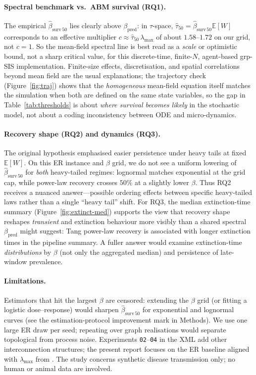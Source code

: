 \documentclass[11pt,a4paper]{article}
\begin{document}
\paragraph{Spectral benchmark vs.\ ABM survival (RQ1).}
The empirical $\hat{\beta}_{\mathrm{surv}\,50}$ lies clearly above $\beta_{\mathrm{pred}}$: in $\tau$-space, $\hat{\tau}_{50}=\hat{\beta}_{\mathrm{surv}\,50}\mathbb{E}[W]$ corresponds to an effective multiplier $c\approx \hat{\tau}_{50}\,\lambda_{\max}$ of about $1.58$--$1.72$ on our grid, not $c{=}1$. So the mean-field spectral line is best read as a \emph{scale} or optimistic bound, not a sharp critical value, for this discrete-time, finite-$N$, agent-based grp-SIS implementation. Finite-size effects, discretisation, and spatial correlations beyond mean field are the usual explanations; the trajectory check (Figure~\ref{fig:traj}) shows that the \emph{homogeneous} mean-field equation itself matches the simulation when both are defined on the same state variables, so the gap in Table~\ref{tab:thresholds} is about \emph{where survival becomes likely} in the stochastic model, not about a coding inconsistency between ODE and micro-dynamics.

\paragraph{Recovery shape (RQ2) and dynamics (RQ3).}
The original hypothesis emphasised easier persistence under heavy tails at fixed $\mathbb{E}[W]$. On this ER instance and $\beta$ grid, we do not see a uniform lowering of $\hat{\beta}_{\mathrm{surv}\,50}$ for \emph{both} heavy-tailed regimes: lognormal matches exponential at the grid cap, while power-law recovery crosses $50\%$ at a slightly lower $\beta$. Thus RQ2 receives a nuanced answer---possible ordering effects between specific heavy-tailed laws rather than a single ``heavy tail'' shift. For RQ3, the median extinction-time summary (Figure~\ref{fig:extinct-med}) supports the view that recovery shape reshapes \emph{transient} and extinction behaviour more visibly than a shared spectral $\beta_{\mathrm{pred}}$ might suggest: Tang power-law recovery is associated with longer extinction times in the pipeline summary. A fuller answer would examine extinction-time \emph{distributions} by $\beta$ (not only the aggregated median) and persistence of late-window prevalence.

\paragraph{Limitations.}
Estimators that hit the largest $\beta$ are censored: extending the $\beta$ grid (or fitting a logistic dose--response) would sharpen $\hat{\beta}_{\mathrm{surv}\,50}$ for exponential and lognormal curves (see the estimation-protocol improvement mark in Methods). We use one large ER draw per seed; repeating over graph realisations would separate topological from process noise. Experiments \texttt{02}--\texttt{04} in the XML add other interconnection structures; the present report focuses on the ER baseline aligned with $\lambda_{\max}$ from . The study concerns synthetic disease transmission only; no human or animal data are involved.
\end{document}

